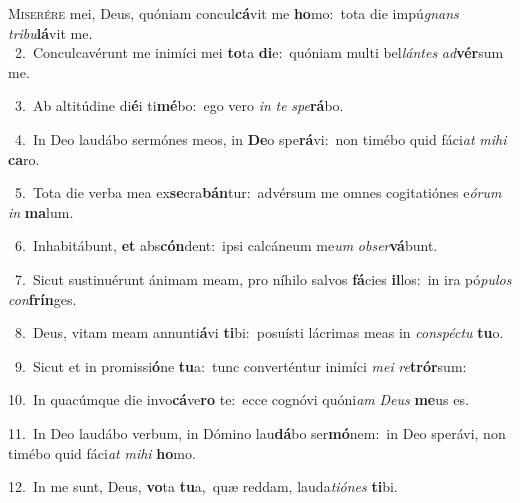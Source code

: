 \lettrine{\initial\textcolor{\initialcolor}{M}}{iserére} mei, Deus, quóniam concul\-\textbf{cá}\-vit me \textbf{ho}\-mo:~\star tota die impú\textit{gnans} \textit{tri}\-\textit{bu}\textbf{lá}vit me.\\
{\numbfont\textcolor{\numbcolor}{~2.}}~Conculcavérunt me inimíci mei \textbf{to}\-ta \textbf{di}\-e:~\star quóniam multi bel\-\textit{lán}\-\textit{tes} \textit{ad}\-\textbf{vér}sum me.\par
{\numbfont\textcolor{\numbcolor}{~3.}}~Ab altitúdine di\-\textbf{é}\-i ti\-\textbf{mé}\-bo:~\star ego vero \textit{in} \textit{te} \textit{spe}\-\textbf{rá}bo.\par
{\numbfont\textcolor{\numbcolor}{~4.}}~In Deo laudábo sermónes meos, in \textbf{De}\-o spe\-\textbf{rá}\-vi:~\star non timébo quid fáci\textit{at} \textit{mi}\-\textit{hi} \textbf{ca}\-ro.\par
{\numbfont\textcolor{\numbcolor}{~5.}}~Tota die verba mea ex\-\textbf{se}\-cra\-\textbf{bán}\-tur:~\star advérsum me omnes cogitatiónes e\-\textit{ó}\-\textit{rum} \textit{in} \textbf{ma}\-lum.\par
{\numbfont\textcolor{\numbcolor}{~6.}}~Inhabitábunt, \textbf{et} abs\-\textbf{cón}\-dent:~\star ipsi calcáneum me\textit{um} \textit{ob}\-\textit{ser}\textbf{vá}bunt.\par
{\numbfont\textcolor{\numbcolor}{~7.}}~Sicut sustinuérunt ánimam meam, pro níhilo salvos \textbf{fá}\-cies \textbf{il}\-los:~\star in ira pó\-\textit{pu}\-\textit{los} \textit{con}\-\textbf{frín}ges.\par
{\numbfont\textcolor{\numbcolor}{~8.}}~Deus, vitam meam annunti\-\textbf{á}\-vi \textbf{ti}\-bi:~\star posuísti lácrimas meas in \textit{con}\-\textit{spéc}\textit{tu} \textbf{tu}\-o.\par
{\numbfont\textcolor{\numbcolor}{~9.}}~Sicut et in promissi\-\textbf{ó}\-ne \textbf{tu}\-a:~\star tunc converténtur inimíci \textit{me}\-\textit{i} \textit{re}\-\textbf{trór}sum:\par
{\numbfont\textcolor{\numbcolor}{10.}}~In quacúmque die invo\-\textbf{cá}\-ve\textbf{ro} te:~\star ecce cognóvi quóni\textit{am} \textit{De}\-\textit{us} \textbf{me}\-us es.\par
{\numbfont\textcolor{\numbcolor}{11.}}~In Deo laudábo verbum, in Dómino lau\-\textbf{dá}\-bo ser\-\textbf{mó}\-nem:~\star in Deo sperávi, non timébo quid fáci\textit{at} \textit{mi}\-\textit{hi} \textbf{ho}\-mo.\par
{\numbfont\textcolor{\numbcolor}{12.}}~In me sunt, Deus, \textbf{vo}\-ta \textbf{tu}\-a,~\star quæ reddam, lauda\-\textit{ti}\-\textit{ó}\textit{nes} \textbf{ti}\-bi.\par
